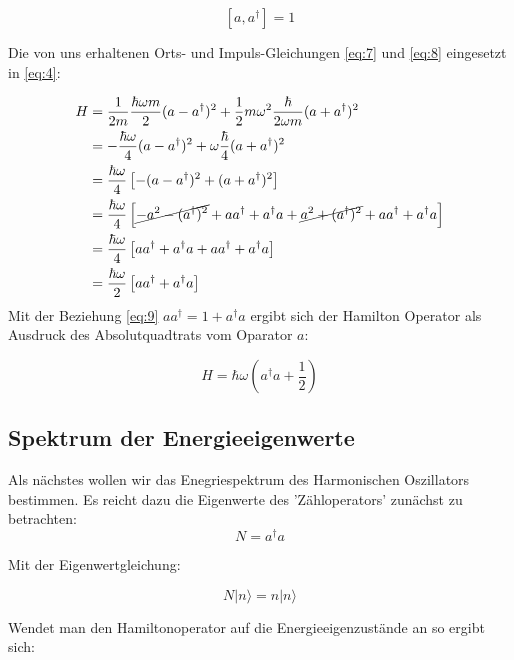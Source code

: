 \begin{equation}
  \label{eq:9}
  \boxed{[a,a^\dagger]=1}
\end{equation}

Die von uns erhaltenen Orts- und Impuls-Gleichungen \eqref{eq:7} und \eqref{eq:8} eingesetzt in \eqref{eq:4}:


\begin{align}
  \label{eq:10}
   H &= \frac{1}{2m}\frac{\hbar \omega m}{2}(a-a^\dagger)^2 +  \frac{1}{2}m\omega^2\frac{\hbar}{2\omega m}(a+a^\dagger)^2 \\
&= -\frac{\hbar \omega}{4}(a-a^\dagger)^2 +  \omega\frac{\hbar}{4}(a+a^\dagger)^2 \\
&= \frac{\hbar \omega}{4}\left[-(a-a^\dagger)^2 + (a+a^\dagger)^2\right] \\
&= \frac{\hbar \omega}{4}\left[\cancel{-a^2-(a^\dagger)^2}+aa^\dagger+a^\dagger a +\cancel{a^2+(a^\dagger)^2}+aa^\dagger+a^\dagger a \right] \\
&= \frac{\hbar \omega}{4}\left[aa^\dagger+a^\dagger a +aa^\dagger+a^\dagger a \right] \\
&= \frac{\hbar \omega}{2}\left[aa^\dagger+a^\dagger a \right] \\
\end{align}
Mit der Beziehung \eqref{eq:9} \(aa^\dagger = 1 + a^\dagger a \) ergibt sich der Hamilton Operator als Ausdruck des Absolutquadtrats vom Oparator \(a\):

\begin{equation}
  \label{eq:11}
  \boxed{ H = \hbar\omega\left(a^\dagger a + \frac{1}{2}\right) }
\end{equation}

\subsection*{Spektrum der Energieeigenwerte}

Als nächstes wollen wir das Enegriespektrum des Harmonischen Oszillators bestimmen. Es reicht dazu die Eigenwerte des 'Zähloperators' zunächst zu betrachten:
\begin{equation}
  \label{eq:12}
  N = a^\dagger a
\end{equation}

Mit der Eigenwertgleichung:

\begin{equation}
  \label{eq:13}
  N|n\rangle  = n|n\rangle 
\end{equation}

Wendet man den Hamiltonoperator auf die Energieeigenzustände an so ergibt sich:

